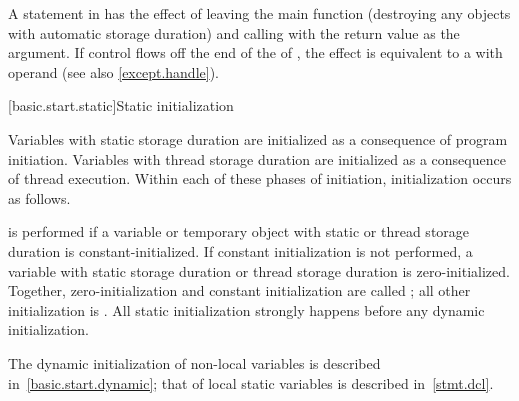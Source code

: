 \pnum
{}%
%
A  statement in  has the effect of leaving the main
function (destroying any objects with automatic storage duration) and
calling  with the return value as the argument.
If control flows off the end of
the  of ,
the effect is equivalent to a  with operand 
(see also \ref{except.handle}).

[basic.start.static]{Static initialization}

\pnum
{}%
%
Variables with static storage duration
are initialized as a consequence of program initiation. Variables with
thread storage duration are initialized as a consequence of thread execution.
Within each of these phases of initiation, initialization occurs as follows.

\pnum
{}%
%
 is performed
if a variable or temporary object with static or thread storage duration
is constant-initialized.
%
If constant initialization is not performed, a variable with static
storage duration or thread storage
duration is zero-initialized.
Together, zero-initialization and constant initialization are called
%
;
all other initialization is .
All static initialization strongly happens before
any dynamic initialization.
\begin{note} The dynamic initialization of non-local variables is described
in~\ref{basic.start.dynamic}; that of local static variables is described
in~\ref{stmt.dcl}. \end{note}

